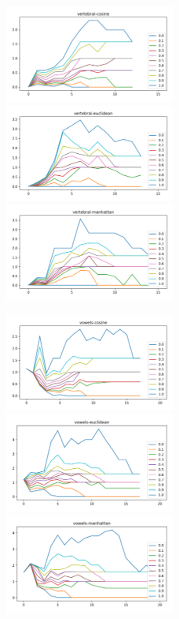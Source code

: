 \begin{figure}[!t]
\includegraphics[width=2.2in]{kdd/static/lfd_vs_depth/vertebral-cosine.png}
\includegraphics[width=2.2in]{kdd/static/lfd_vs_depth/vertebral-euclidean.png}
\includegraphics[width=2.2in]{kdd/static/lfd_vs_depth/vertebral-manhattan.png}

\includegraphics[width=2.2in]{kdd/static/lfd_vs_depth/vowels-cosine.png}
\includegraphics[width=2.2in]{kdd/static/lfd_vs_depth/vowels-euclidean.png}
\includegraphics[width=2.2in]{kdd/static/lfd_vs_depth/vowels-manhattan.png}


\end{figure}
